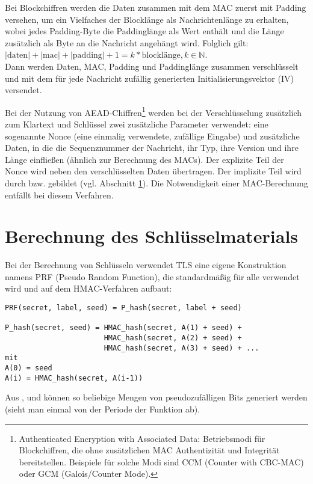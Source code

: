 Bei Blockchiffren werden die Daten zusammen mit dem MAC zuerst mit Padding versehen, um ein Vielfaches der Blocklänge als Nachrichtenlänge zu erhalten, wobei jedes Padding-Byte die Paddinglänge als Wert enthält und die Länge zusätzlich als Byte an die Nachricht angehängt wird. Folglich gilt:
\( |\text{daten}| + |\text{mac}| + |\text{padding}| + 1 = k * \text{blocklänge}, k \in \mathbb{N}\).\\
Dann werden Daten, MAC, Padding und Paddinglänge zusammen verschlüsselt und mit dem für jede Nachricht zufällig generierten Initialisierungsvektor (IV) versendet.

Bei der Nutzung von AEAD-Chiffren\footnote{
	Authenticated Encryption with Associated Data: Betriebsmodi für Blockchiffren, die ohne zusätzlichen MAC Authentizität und Integrität bereitstellen. Beispiele für solche Modi sind CCM (Counter with CBC-MAC) oder GCM (Galois/Counter Mode).
} werden bei der Verschlüsselung zusätzlich zum Klartext und Schlüssel zwei zusätzliche Parameter verwendet: eine sogenannte Nonce (eine einmalig verwendete, zufällige Eingabe) und zusätzliche Daten, in die die Sequenznummer der Nachricht, ihr Typ, ihre Version und ihre Länge einfließen (ähnlich zur Berechnung des MACs). Der explizite Teil der Nonce wird neben den verschlüsselten Daten übertragen. Der implizite Teil wird durch  bzw.  gebildet (vgl. Abschnitt \ref{sec_key_material}). Die Notwendigkeit einer MAC-Berechnung entfällt bei diesem Verfahren.

\section{Berechnung des Schlüsselmaterials}
\label{sec_key_material}

Bei der Berechnung von Schlüsseln verwendet TLS eine eigene Konstruktion namens PRF (Pseudo Random Function), die standardmäßig für alle \ciphersuites{} verwendet wird und auf dem HMAC-Verfahren aufbaut:

\begin{lstlisting}
PRF(secret, label, seed) = P_hash(secret, label + seed)

P_hash(secret, seed) = HMAC_hash(secret, A(1) + seed) +
					   HMAC_hash(secret, A(2) + seed) +
					   HMAC_hash(secret, A(3) + seed) + ...
mit
A(0) = seed
A(i) = HMAC_hash(secret, A(i-1))
\end{lstlisting}

Aus ,  und  können so beliebige Mengen von pseudozufälligen Bits generiert werden (sieht man einmal von der Periode der Funktion ab).

